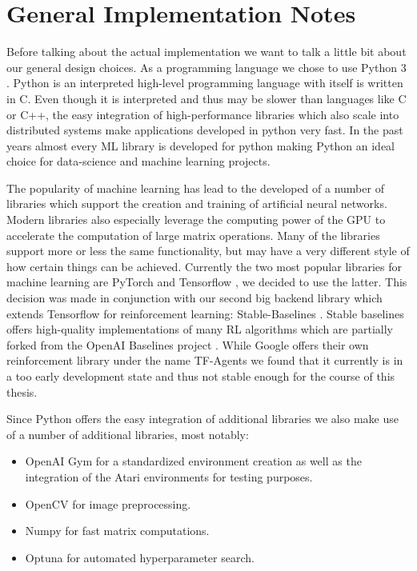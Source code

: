 \section{General Implementation Notes} \label{sec:ImplementationNotes}
Before talking about the actual implementation we want to talk a little bit about our general design choices. As a programming language we chose to use Python 3 \cite{van2011python, pythonWebsite}. Python is an interpreted high-level programming language with itself is written in C. Even though it is interpreted and thus may be slower than languages like C or C++, the easy integration of high-performance libraries which also scale into distributed systems make applications developed in python very fast. In the past years almost every ML library is developed for python making Python an ideal choice for data-science and machine learning projects.

The popularity of machine learning has lead to the developed of a number of libraries which support the creation and training of artificial neural networks. Modern libraries also especially leverage the computing power of the GPU to accelerate the computation of large matrix operations. Many of the libraries support more or less the same functionality, but may have a very different style of how certain things can be achieved. Currently the two most popular libraries for machine learning are PyTorch \cite{paszke2019pytorch} and Tensorflow \cite{abadi2016tensorflow}, we decided to use the latter. This decision was made in conjunction with our second big backend library which extends Tensorflow for reinforcement learning: Stable-Baselines \cite{stable-baselines}. Stable baselines offers high-quality implementations of many RL algorithms which are partially forked from the OpenAI Baselines project \cite{baselines}. While Google offers their own reinforcement library under the name TF-Agents \cite{TFAgents} we found that it currently is in a too early development state and thus not stable enough for the course of this thesis.

Since Python offers the easy integration of additional libraries we also make use of a number of additional libraries, most notably:
\begin{itemize}
    \item OpenAI Gym \cite{openAIgym} for a standardized environment creation as well as the integration of the Atari environments for testing purposes.
    \item OpenCV \cite{opencv_library} for image preprocessing.
    \item Numpy \cite{oliphant2006guide} for fast matrix computations.
    \item Optuna \cite{akiba2019optuna} for automated hyperparameter search.
\end{itemize}

